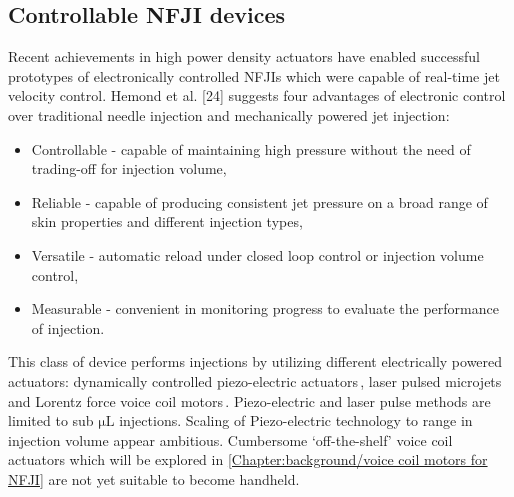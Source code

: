     \subsection{Controllable \acs{NFJI} devices}    \label{Chapter:background/needle-free jet injection/Controllable NFJI}
    
        Recent achievements in high power density actuators have enabled successful prototypes of electronically controlled \acsp{NFJI} which were capable of real-time jet velocity control. Hemond et al. [24] suggests four advantages of electronic control over traditional needle injection and mechanically powered jet injection:
        
        \begin{itemize}
            \item Controllable - capable of maintaining high pressure without the need of trading-off for injection volume,
            \item Reliable - capable of producing consistent jet pressure on a broad range of skin properties and different injection types,
            \item Versatile - automatic reload under closed loop control or injection volume control,
            \item Measurable - convenient in monitoring progress to evaluate the performance of injection.
        \end{itemize}
        
        This class of device performs injections by utilizing different electrically powered actuators: dynamically controlled piezo-electric actuators\,\cite{Stachowiak2009}, laser pulsed microjets\,\cite{tawaga2013, park2012} and Lorentz force voice coil motors\,\cite{taberner2006,hemond2006}. Piezo-electric and laser pulse methods are limited to sub $\mathrm{\mu L}$ injections. Scaling of Piezo-electric technology to   range in injection volume appear ambitious. Cumbersome ‘off-the-shelf’ voice coil actuators which will be explored in \ref{Chapter:background/voice coil motors for NFJI} are not yet suitable to become handheld.

